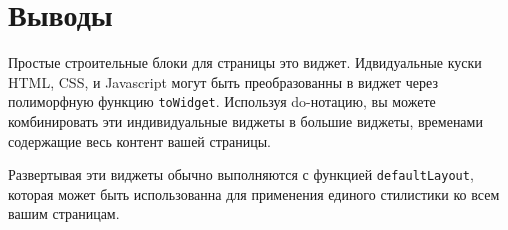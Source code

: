 \section{Выводы}

Простые строительные блоки для страницы это виджет. Идвидуальные куски HTML, CSS, и Javascript могут быть преобразованны в виджет через полиморфную функцию \lstinline'toWidget'. Используя do-нотацию, вы можете комбинировать эти индивидуальные виджеты в большие виджеты, временами содержащие весь контент вашей страницы.

Развертывая эти виджеты обычно выполняются с функцией \lstinline'defaultLayout', которая может быть использованна для применения единого стилистики ко всем вашим страницам.